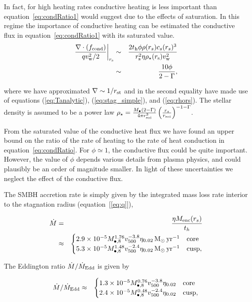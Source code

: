 \documentclass[usenatbib,fleqn]{mn2e}
\newcommand{\eddr}{\dot{M}/\dot{M}_{\rm Edd}}
\newcommand{\rs}{r_s}
\newcommand{\Menc}{M_{\rm enc}}
\newcommand{\Mbh}[1][]{M_{\bullet#1}}
\newcommand{\Mbheight}{M_{\bullet,8}}
\newcommand{\soi}{\rm soi}
\newcommand{\rsoi}{r_{\soi}}
\newcommand{\pyear}{{\rm yr}^{-1}}
\renewcommand{\th}{t_h}
\begin{document}
In fact, for high heating rates conductive heating is less important
than equation~\eqref{eq:condRatio1} would suggest due to the effects
of saturation. In this regime the importance of conductive heating can
be estimated the conductive flux in equation~\eqref{eq:condRatio1}
with its saturated value.
\begin{eqnarray} \left.\frac{\nabla\cdot(f_{\rm cond})}{q v_{\rm
w}^{2}/2}\right|_{r_{\rm s}} &\sim& \frac{2t_{\rm h} \phi \rho(\rs) c_s(\rs)^3}{r_{\rm s}^{2}\eta \rho_{\star}(r_{\rm s}) v_{\rm w}^{2}}
\nonumber \\ &\sim&
\frac{10 \phi}{2-\Gamma}, \label{eq:condRatio}
\end{eqnarray}

where we have approximated $\nabla \sim 1/r_{\rm st}$ and in the
second equality have made use of equations (\ref{eq:Tanalytic}),
(\ref{eq:stag_simple}), and (\ref{eq:rhors}). The stellar density is
assumed to be a power law $\rho_{\star}=\frac{\Mbh
  \left(2-\Gamma\right)}{4 \pi \rsoi^3}
\left(\frac{\rs}{\rsoi}\right)^{-1-\Gamma}$.

From the saturated value of the conductive heat flux we have found an
upper bound on the ratio of the rate of heating to the rate of heat
conduction in equation~\eqref{eq:condRatio}.  For $\phi\simeq 1$, the
conductive flux could be quite important. However, the value of $\phi$
depends various details from plasma physics, and could plausibly be an
order of magnitude smaller. In light of these uncertainties we neglect
the effect of the conductive flux.

The SMBH accretion rate is simply given by the integrated mass loss
rate interior to the stagnation radius (equation~[\ref{eq:q}]), 

\begin{eqnarray}
  \dot{M} &=& \frac{\eta \Menc(\rs)}{\th} \nonumber \\
&\approx&
  \begin{cases}
    2.9 \times 10^{-5} M_{\bullet,8}^{1.76}
    v_{500}^{-3.8}  \eta_{0.02} \Msun \, \pyear& \text{core} \\
    5.3 \times 10^{-5} M_{\bullet,8}^{1.48} 
    v_{500}^{-2.4}  \eta_{0.02} \Msun \, \pyear  & \text{cusp}, 
  \end{cases}
  \label{eq:mdot_analytic}
\end{eqnarray}

The Eddington ratio $\eddr$ is given by 

\begin{eqnarray}
\eddr&\approx&
  \begin{cases}
    1.3 \times 10^{-5} M_{\bullet,8}^{0.76}
    v_{500}^{-3.8}  \eta_{0.02}   & \text{core} \\
    2.4 \times 10^{-5} \Mbheight^{0.48} 
    v_{500}^{-2.4}  \eta_{0.02}   & \text{cusp}, 
  \end{cases}
  \label{eq:eddr_analytic}
\end{eqnarray}
\end{document}
